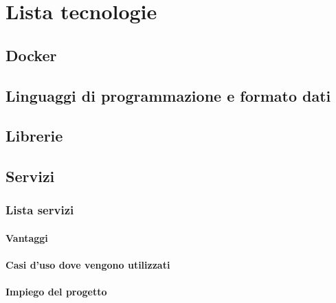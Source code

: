 \section{Lista tecnologie}

\subsection{Docker}

\subsection{Linguaggi di programmazione e formato dati}

\subsection{Librerie}

\subsection{Servizi}

\subsubsection{Lista servizi}

\paragraph{Vantaggi}

\paragraph{Casi d'uso dove vengono utilizzati}

\paragraph{Impiego del progetto}